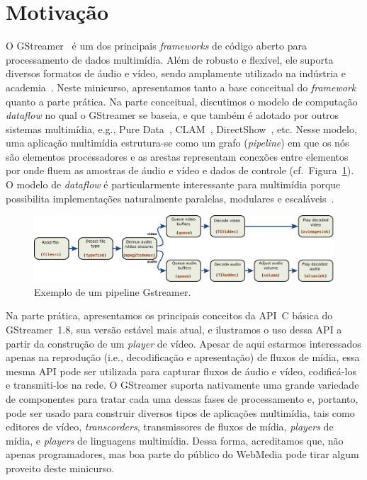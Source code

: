 \documentclass{SBCbookchapter}
\begin{document}

\section{Motivação}

O GStreamer~\cite{gstreamer} é um dos principais \emph{frameworks} de código
aberto para processamento de dados multimídia.  Além de robusto e flexível,
ele suporta diversos formatos de áudio e vídeo, sendo amplamente utilizado
na indústria e academia~\cite{gstreamer-apps}.  Neste minicurso,
apresentamos tanto a base conceitual do \emph{framework} quanto a parte
prática.  Na parte conceitual, discutimos o modelo de computação
\emph{dataflow} no qual o GStreamer se baseia, e que também é adotado por
outros sistemas multimídia, e.g., Pure Data~\cite{Puckette-M-S-2007},
CLAM~\cite{Amatriain-X-2008}, DirectShow~\cite{Chatterjee-A-1997}, etc.
Nesse modelo, uma aplicação multimídia estrutura-se como um grafo
(\emph{pipeline}) em que os nós são elementos processadores e as arestas
representam conexões entre elementos por onde fluem as amostras de áudio e
vídeo e dados de controle (cf.~Figura~\ref{fig:pipeline}).  O modelo de
\emph{dataflow} é particularmente interessante para multimídia porque
possibilita implementações naturalmente paralelas, modulares e
escaláveis~\cite{Yviquel-H-2014}.

\begin{figure}[ht!]
  \label{fig:pipeline}
  \includegraphics[width=\textwidth]{pics/gstreamer_pipeline.pdf}
  \caption{Exemplo de um pipeline Gstreamer.}
\end{figure}

Na parte prática, apresentamos os principais conceitos da API~C básica do
GStreamer~1.8, sua versão estável mais atual, e ilustramos o uso dessa API a
partir da construção de um \emph{player} de vídeo.  Apesar de aqui estarmos
interessados apenas na reprodução (i.e., decodificação e apresentação) de
fluxos de mídia, essa mesma API pode ser utilizada para capturar fluxos de
áudio e vídeo, codificá-los e transmiti-los na rede.  O GStreamer suporta
nativamente uma grande variedade de componentes para tratar cada uma dessas
fases de processamento e, portanto, pode ser usado para construir diversos
tipos de aplicações multimídia, tais como editores de vídeo,
\emph{transcorders}, transmissores de fluxos de mídia, \emph{players} de
mídia, e \emph{players} de linguagens multimídia.  Dessa forma, acreditamos
que, não apenas programadores, mas boa parte do público do WebMedia pode
tirar algum proveito deste minicurso.
\end{document}
